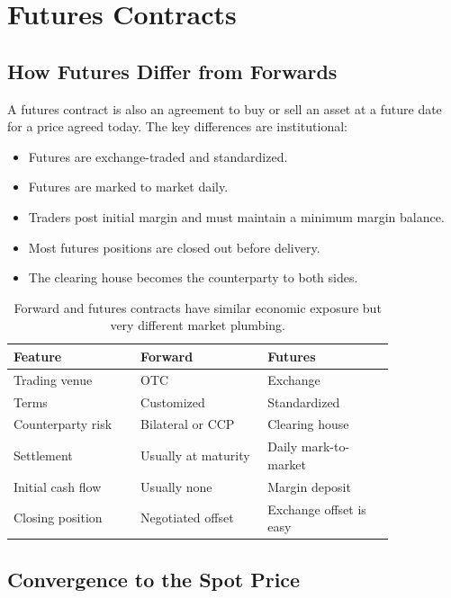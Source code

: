 \section{Futures Contracts}

\subsection{How Futures Differ from Forwards}

A futures contract is also an agreement to buy or sell an asset at a future date
for a price agreed today. The key differences are institutional:
\begin{itemize}
    \item Futures are exchange-traded and standardized.
    \item Futures are marked to market daily.
    \item Traders post initial margin and must maintain a minimum margin balance.
    \item Most futures positions are closed out before delivery.
    \item The clearing house becomes the counterparty to both sides.
\end{itemize}

\begin{table}
\centering
\begin{tabular}{p{0.28\linewidth}p{0.28\linewidth}p{0.28\linewidth}}
\toprule
Feature & Forward & Futures \\
\midrule
Trading venue & OTC & Exchange \\
Terms & Customized & Standardized \\
Counterparty risk & Bilateral or CCP & Clearing house \\
Settlement & Usually at maturity & Daily mark-to-market \\
Initial cash flow & Usually none & Margin deposit \\
Closing position & Negotiated offset & Exchange offset is easy \\
\bottomrule
\end{tabular}
\caption{Forward and futures contracts have similar economic exposure but very
different market plumbing.}
\end{table}

\subsection{Convergence to the Spot Price}

